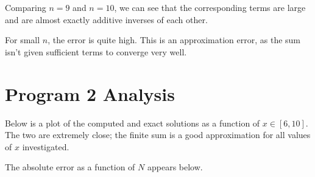 \documentclass[11pt]{article}
\begin{document}
Comparing \(n=9\) and \(n=10\), we can see that the corresponding terms are large and are almost exactly additive inverses of each other.

For small \(n\), the error is quite high. This is an approximation error, as the sum isn't given sufficient terms to converge very well.

\section{Program 2 Analysis}
\label{sec:orgf7f6b3d}

Below is a plot of the computed and exact solutions as a function of \(x\in[6, 10]\). The two are extremely close; the finite sum is a good approximation for all values of \(x\) investigated.

The absolute error as a function of \(N\) appears below. 
\end{document}
